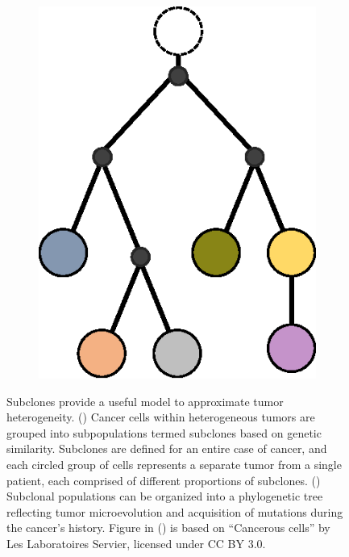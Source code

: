 \begin{figure}[tbh]
\begin{subfigure}{0.31\textwidth}
        \includegraphics[width=\linewidth,keepaspectratio]{images/intro/tree_example}
        \vspace{-0.07cm}
        \caption{}\label{fig:intro:tree_example}
    \end{subfigure}
    \vspace{-0.3cm}
    \caption[Subclones can approximate intratumor heterogeneity.]{Subclones provide a useful model to approximate tumor heterogeneity. () Cancer cells within heterogeneous tumors are grouped into subpopulations termed subclones based on genetic similarity. Subclones are defined for an entire case of cancer, and each circled group of cells represents a separate tumor from a single patient, each comprised of different proportions of subclones. () Subclonal populations can be organized into a phylogenetic tree reflecting tumor microevolution and acquisition of mutations during the cancer's history. Figure in () is based on ``Cancerous cells'' by Les Laboratoires Servier, licensed under CC BY 3.0.}
    \label{fig:intro:subclones_example}
\end{figure}
